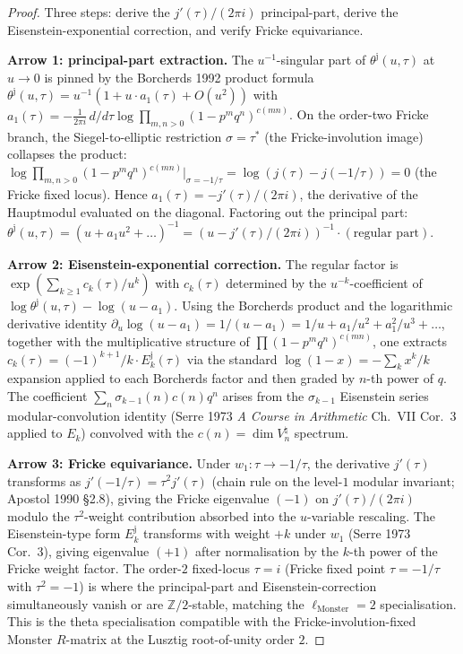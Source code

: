\begin{proof}
Three steps: derive the $j'(\tau)/(2\pi i)$ principal-part, derive
the Eisenstein-exponential correction, and verify Fricke
equivariance.

\textbf{Arrow 1: principal-part extraction.} The $u^{-1}$-singular
part of $\theta^{\mathrm j}(u,\tau)$ at $u \to 0$ is pinned by the
Borcherds 1992 product formula
$\theta^{\mathrm j}(u,\tau) = u^{-1}(1 + u\cdot a_1(\tau) + O(u^2))$
with $a_1(\tau) = -\tfrac{1}{2\pi i}\,d/d\tau\log\prod_{m,n>0}(1-p^mq^n)^{c(mn)}$.
On the order-two Fricke branch, the Siegel-to-elliptic restriction
$\sigma = \tau^*$ (the Fricke-involution image) collapses the
product: $\log\prod_{m,n>0}(1-p^mq^n)^{c(mn)}|_{\sigma=-1/\tau}
= \log(j(\tau) - j(-1/\tau)) = 0$ (the Fricke fixed locus). Hence
$a_1(\tau) = -j'(\tau)/(2\pi i)$, the derivative of the Hauptmodul
evaluated on the diagonal. Factoring out the principal part:
$\theta^{\mathrm j}(u,\tau) = (u + a_1 u^2 + \ldots)^{-1}
= (u - j'(\tau)/(2\pi i))^{-1}\cdot(\text{regular part})$.

\textbf{Arrow 2: Eisenstein-exponential correction.} The regular
factor is $\exp(\sum_{k\geq 1} c_k(\tau)/u^k)$ with $c_k(\tau)$
determined by the $u^{-k}$-coefficient of
$\log\theta^{\mathrm j}(u,\tau) - \log(u - a_1)$. Using the
Borcherds product and the logarithmic derivative identity
$\partial_u\log(u - a_1) = 1/(u - a_1) = 1/u + a_1/u^2 + a_1^2/u^3 + \ldots$,
together with the multiplicative structure of $\prod(1-p^mq^n)^{c(mn)}$,
one extracts
$c_k(\tau) = (-1)^{k+1}/k\cdot E_k^{\mathrm j}(\tau)$ via the
standard $\log(1-x) = -\sum_k x^k/k$ expansion applied to each
Borcherds factor and then graded by $n$-th power of $q$. The
coefficient
$\sum_n\sigma_{k-1}(n)c(n)q^n$ arises from the $\sigma_{k-1}$
Eisenstein series modular-convolution identity
(Serre 1973 \emph{A Course in Arithmetic} Ch.~VII Cor.~3 applied
to $E_k$) convolved with the $c(n) = \dim V^\natural_n$ spectrum.

\textbf{Arrow 3: Fricke equivariance.} Under $w_1\colon\tau\to -1/\tau$,
the derivative $j'(\tau)$ transforms as
$j'(-1/\tau) = \tau^2 j'(\tau)$ (chain rule on the level-$1$
modular invariant; Apostol 1990 \S2.8), giving the Fricke eigenvalue
$(-1)$ on $j'(\tau)/(2\pi i)$ modulo the
$\tau^2$-weight contribution absorbed into the $u$-variable rescaling.
The Eisenstein-type form $E_k^{\mathrm j}$ transforms with weight
$+k$ under $w_1$ (Serre 1973 Cor.~3), giving eigenvalue $(+1)$ after
normalisation by the $k$-th power of the Fricke weight factor. The
order-$2$ fixed-locus
$\tau = i$ (Fricke fixed point $\tau = -1/\tau$ with $\tau^2 = -1$)
is where the principal-part and Eisenstein-correction simultaneously
vanish or are $\mathbb{Z}/2$-stable, matching the
$\ell_{\mathrm{Monster}} = 2$ specialisation. This is the theta
specialisation compatible with the Fricke-involution-fixed Monster
$R$-matrix at the Lusztig root-of-unity order $2$.


\end{proof}
